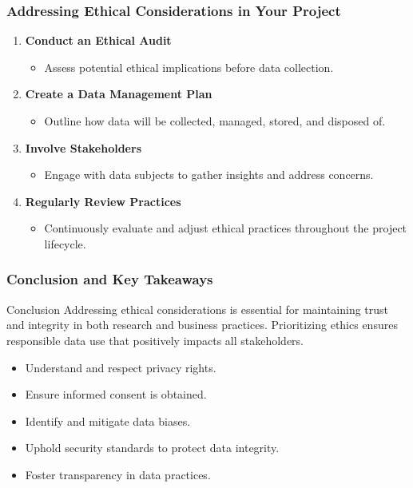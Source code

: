 \documentclass[aspectratio=169]{beamer}
\begin{document}
\begin{frame}[fragile]
    \frametitle{Addressing Ethical Considerations in Your Project}
    
    \begin{enumerate}
        \item \textbf{Conduct an Ethical Audit}
        \begin{itemize}
            \item Assess potential ethical implications before data collection.
        \end{itemize}
        
        \item \textbf{Create a Data Management Plan}
        \begin{itemize}
            \item Outline how data will be collected, managed, stored, and disposed of.
        \end{itemize}
        
        \item \textbf{Involve Stakeholders}
        \begin{itemize}
            \item Engage with data subjects to gather insights and address concerns.
        \end{itemize}
        
        \item \textbf{Regularly Review Practices}
        \begin{itemize}
            \item Continuously evaluate and adjust ethical practices throughout the project lifecycle.
        \end{itemize}
    \end{enumerate}
\end{frame}

\begin{frame}[fragile]
    \frametitle{Conclusion and Key Takeaways}
    
    \begin{block}{Conclusion}
        Addressing ethical considerations is essential for maintaining trust and integrity in both research and business practices. Prioritizing ethics ensures responsible data use that positively impacts all stakeholders.
    \end{block}
    
    \begin{itemize}
        \item Understand and respect privacy rights.
        \item Ensure informed consent is obtained.
        \item Identify and mitigate data biases.
        \item Uphold security standards to protect data integrity.
        \item Foster transparency in data practices.
    \end{itemize}
\end{frame}
\end{document}
